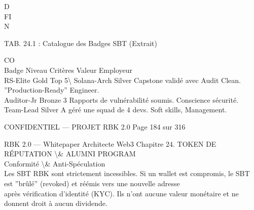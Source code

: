 \vspace{0.5em}
\vspace{0.5em}
D\\
FI\\
N\\
\begin{center}\begin{tabular}TAB. 24.1 : Catalogue des Badges SBT (Extrait)\end{tabular}\end{center}
CO\\
Badge       Niveau Critères                           Valeur Employeur\\
RS-Elite    Gold   Top 5\textbackslash{}%
Solana-Arch Silver Capstone validé avec Audit Clean. ”Production-Ready” Engineer.\\
Auditor-Jr Bronze 3 Rapports de vulnérabilité soumis. Conscience sécurité.\\
Team-Lead Silver A géré une squad de 4 devs.          Soft skills, Management.\\
\vspace{0.5em}
\vspace{0.5em}
\vspace{0.5em}
\vspace{0.5em}
\begin{confidential}CONFIDENTIEL — PROJET RBK 2.0                                    Page 184 sur 316\end{confidential}
RBK 2.0 — Whitepaper Architecte Web3                                             Chapitre 24. TOKEN DE RÉPUTATION \textbackslash{}& ALUMNI PROGRAM\\
\vspace{0.5em}
\vspace{0.5em}
Conformité \textbackslash{}& Anti-Spéculation\\
\vspace{0.5em}
Les SBT RBK sont strictement incessibles. Si un wallet est compromis, le SBT est ”brûlé” (revoked) et réémis vers une nouvelle adresse\\
après vérification d’identité (KYC). Ils n’ont aucune valeur monétaire et ne donnent droit à aucun dividende.\\
\vspace{0.5em}
\vspace{0.5em}
\vspace{0.5em}
